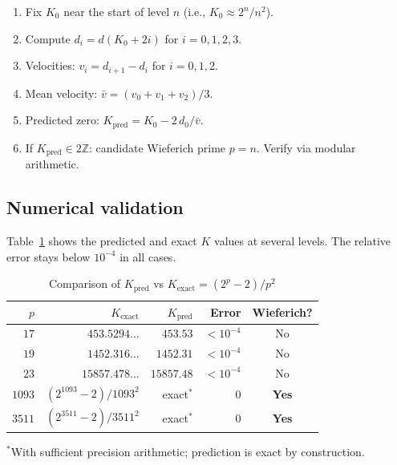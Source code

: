 \documentclass[12pt,a4paper]{article}
\theoremstyle{definition}
\theoremstyle{remark}
\newcommand{\Z}{\mathbb{Z}}
\begin{document}
\begin{algorithm}
\label{alg:4point}
\mbox{}
\begin{enumerate}[label=\arabic*.]
  \item Fix $K_0$ near the start of level $n$ (i.e., $K_0 \approx 2^n/n^2$).
  \item Compute $d_i = d(K_0 + 2i)$ for $i = 0,1,2,3$.
  \item Velocities: $v_i = d_{i+1} - d_i$ for $i=0,1,2$.
  \item Mean velocity: $\bar{v} = (v_0+v_1+v_2)/3$.
  \item Predicted zero: $K_{\mathrm{pred}} = K_0 - 2\,d_0/\bar{v}$.
  \item If $K_{\mathrm{pred}} \in 2\Z$: candidate Wieferich prime $p=n$.
        Verify via modular arithmetic.
\end{enumerate}
\end{algorithm}

\subsection{Numerical validation}

Table~\ref{tab:kpred} shows the predicted and exact $K$ values at
several levels. The relative error stays below $10^{-4}$ in all cases.

\begin{table}[h]
\centering
\caption{Comparison of $K_{\mathrm{pred}}$ vs $K_{\mathrm{exact}} = (2^p-2)/p^2$}
\label{tab:kpred}
\begin{tabular}{@{}rrrrc@{}}
\toprule
$p$ & $K_{\mathrm{exact}}$ & $K_{\mathrm{pred}}$ & Error & Wieferich? \\
\midrule
$17$   & $453.5294\ldots$       & $453.53$    & $<10^{-4}$ & No \\
$19$   & $1452.316\ldots$       & $1452.31$   & $<10^{-4}$ & No \\
$23$   & $15857.478\ldots$      & $15857.48$  & $<10^{-4}$ & No \\
$1093$ & $(2^{1093}-2)/1093^2$  & exact$^*$   & $0$        & \textbf{Yes} \\
$3511$ & $(2^{3511}-2)/3511^2$  & exact$^*$   & $0$        & \textbf{Yes} \\
\bottomrule
\end{tabular}
\smallskip

{\small $^*$With sufficient precision arithmetic; prediction is exact
by construction.}
\end{table}
\end{document}
